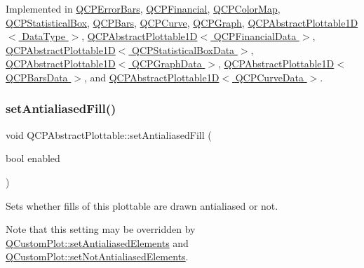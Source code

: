 Implemented in \hyperlink{class_q_c_p_error_bars_ac1b6675ef43e32547a3cbcf7b7ac46ed}{Q\+C\+P\+Error\+Bars}, \hyperlink{class_q_c_p_financial_aac8e91622ac58330fa9ce81cc8fd40ee}{Q\+C\+P\+Financial}, \hyperlink{class_q_c_p_color_map_afb4b843596addf58096082827a9e3450}{Q\+C\+P\+Color\+Map}, \hyperlink{class_q_c_p_statistical_box_a1607fa92f829c631107c20ccb2d70a6d}{Q\+C\+P\+Statistical\+Box}, \hyperlink{class_q_c_p_bars_a121f899c27af3186fe93dcd0eb98f49b}{Q\+C\+P\+Bars}, \hyperlink{class_q_c_p_curve_a0ed9b7e6b4bc72010d6fcd974af46a8b}{Q\+C\+P\+Curve}, \hyperlink{class_q_c_p_graph_a6d669d04462d272c6aa0e5f85846d673}{Q\+C\+P\+Graph}, \hyperlink{class_q_c_p_abstract_plottable1_d_a071e2df66ba1746067dfcb5e27947b43}{Q\+C\+P\+Abstract\+Plottable1\+D$<$ Data\+Type $>$}, \hyperlink{class_q_c_p_abstract_plottable1_d_a071e2df66ba1746067dfcb5e27947b43}{Q\+C\+P\+Abstract\+Plottable1\+D$<$ Q\+C\+P\+Financial\+Data $>$}, \hyperlink{class_q_c_p_abstract_plottable1_d_a071e2df66ba1746067dfcb5e27947b43}{Q\+C\+P\+Abstract\+Plottable1\+D$<$ Q\+C\+P\+Statistical\+Box\+Data $>$}, \hyperlink{class_q_c_p_abstract_plottable1_d_a071e2df66ba1746067dfcb5e27947b43}{Q\+C\+P\+Abstract\+Plottable1\+D$<$ Q\+C\+P\+Graph\+Data $>$}, \hyperlink{class_q_c_p_abstract_plottable1_d_a071e2df66ba1746067dfcb5e27947b43}{Q\+C\+P\+Abstract\+Plottable1\+D$<$ Q\+C\+P\+Bars\+Data $>$}, and \hyperlink{class_q_c_p_abstract_plottable1_d_a071e2df66ba1746067dfcb5e27947b43}{Q\+C\+P\+Abstract\+Plottable1\+D$<$ Q\+C\+P\+Curve\+Data $>$}.

\mbox{\label{class_q_c_p_abstract_plottable_a089d6b5577120239b55c39ed27c39536}} 
\subsubsection{\texorpdfstring{set\+Antialiased\+Fill()}{setAntialiasedFill()}}
{\footnotesize\ttfamily void Q\+C\+P\+Abstract\+Plottable\+::set\+Antialiased\+Fill (\begin{DoxyParamCaption}\item[{bool}]{enabled }\end{DoxyParamCaption})}

Sets whether fills of this plottable are drawn antialiased or not.

Note that this setting may be overridden by \hyperlink{class_q_custom_plot_af6f91e5eab1be85f67c556e98c3745e8}{Q\+Custom\+Plot\+::set\+Antialiased\+Elements} and \hyperlink{class_q_custom_plot_ae10d685b5eabea2999fb8775ca173c24}{Q\+Custom\+Plot\+::set\+Not\+Antialiased\+Elements}. \mbox{\label{class_q_c_p_abstract_plottable_a2f03f067ede2ed4da6f7d0e4777a3f02}} 
